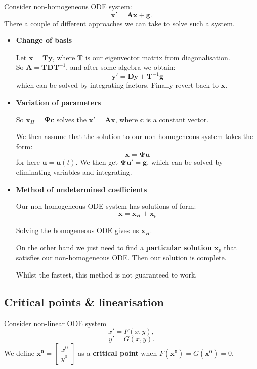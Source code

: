 \documentclass{article}
\begin{document}
Consider non-homogeneous ODE system:
$$\boldsymbol{x}'=\boldsymbol{A}\boldsymbol{x}+\boldsymbol{g}.$$
There a couple of different approaches we can take to solve such a system.
\begin{itemize}
    \item \textbf{Change of basis}
        
    Let $\boldsymbol{x}=\boldsymbol{T}\boldsymbol{y}$,
    where $\boldsymbol{T}$ is our eigenvector matrix from diagonalisation. \\
    So $\boldsymbol{A}=\boldsymbol{T}\boldsymbol{D}\boldsymbol{T}^{-1}$,
    and after some algebra we obtain:
    $$\boldsymbol{y}'=\boldsymbol{D}\boldsymbol{y}+\boldsymbol{T}^{-1}\boldsymbol{g}$$
    which can be solved by integrating factors. Finally revert back to $\boldsymbol{x}$.

    \item \textbf{Variation of parameters}

    So $\boldsymbol{x}_H=\boldsymbol{\Psi}\boldsymbol{c}$ solves the $\boldsymbol{x}'=\boldsymbol{A}\boldsymbol{x}$,
    where $\boldsymbol{c}$ is a constant vector.
        
    We then assume that the solution to our non-homogeneous system takes the form:
    $$\boldsymbol{x}=\boldsymbol{\Psi}\boldsymbol{u}$$
    for here $\boldsymbol{u} = \boldsymbol{u}(t)$. We then get $\boldsymbol{\Psi}\boldsymbol{u}'=\boldsymbol{g}$,
    which can be solved by eliminating variables and integrating.

    \item \textbf{Method of undetermined coefficients}

    Our non-homogeneous ODE system has solutions of form:
    $$\boldsymbol{x}=\boldsymbol{x}_H + \boldsymbol{x}_p$$

    Solving the homogeneous ODE gives us $\boldsymbol{x}_H$.
        
    On the other hand we just need to find a \textbf{particular solution}
    $\boldsymbol{x}_p$ that satisfies our non-homogeneous ODE. Then our solution is complete.

    Whilst the fastest, this method is not guaranteed to work.        
    \end{itemize}
    
\newpage

\subsection{Critical points \& linearisation}
Consider non-linear ODE system
$$x'=F(x, y),$$
$$y'=G(x, y).$$
We define $\boldsymbol{x^0}=\begin{bmatrix} x^0 \\ y^0 \end{bmatrix}$
as a \textbf{critical point} when $F(\boldsymbol{x^0})=G(\boldsymbol{x^0})=0$.
\end{document}
